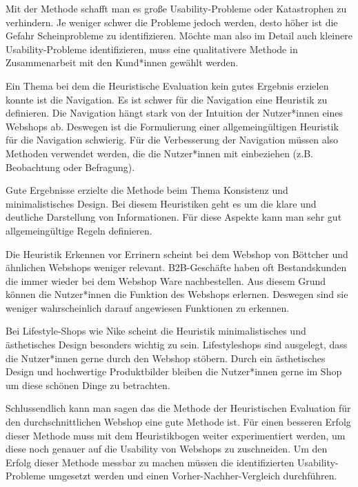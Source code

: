 \documentclass[utf8,biblatex]{lni}
\begin{document}
Mit der Methode schafft man es große Usability-Probleme oder Katastrophen zu verhindern. Je weniger schwer die Probleme jedoch werden, desto höher ist die Gefahr Scheinprobleme zu identifizieren. Möchte man also im Detail auch kleinere Usability-Probleme identifizieren, muss eine qualitativere Methode in Zusammenarbeit mit den Kund*innen gewählt werden.

Ein Thema bei dem die Heuristische Evaluation kein gutes Ergebnis erzielen konnte ist die Navigation. Es ist schwer für die Navigation eine Heuristik zu definieren. Die Navigation hängt stark von der Intuition der Nutzer*innen eines Webshops ab. Deswegen ist die Formulierung einer allgemeingültigen Heuristik für die Navigation schwierig. Für die Verbesserung der Navigation müssen also Methoden verwendet werden, die die Nutzer*innen mit einbeziehen (z.B. Beobachtung oder Befragung). 

Gute Ergebnisse erzielte die Methode beim Thema Konsistenz und minimalistisches Design. Bei diesem Heuristiken geht es um die klare und deutliche Darstellung von Informationen. Für diese Aspekte kann man sehr gut allgemeingültige Regeln definieren. 

Die Heuristik \glqq Erkennen vor Errinern\grqq{} scheint bei dem Webshop von Böttcher und ähnlichen Webshops weniger relevant. B2B-Geschäfte haben oft Bestandskunden die immer wieder bei dem Webshop Ware nachbestellen. Aus diesem Grund können die Nutzer*innen die Funktion des Webshops erlernen. Deswegen sind sie weniger wahrscheinlich darauf angewiesen Funktionen zu erkennen.

Bei Lifestyle-Shops wie Nike scheint die Heuristik \glqq minimalistisches und ästhetisches Design\grqq{} besonders wichtig zu sein. Lifestyleshops sind ausgelegt, dass die Nutzer*innen gerne durch den Webshop stöbern. Durch ein ästhetisches Design und hochwertige Produktbilder bleiben die Nutzer*innen gerne im Shop um diese schönen Dinge zu betrachten.

Schlussendlich kann man sagen das die Methode der Heuristischen Evaluation für den durchschnittlichen Webshop eine gute Methode ist. Für einen besseren Erfolg dieser Methode muss mit dem Heuristikbogen weiter experimentiert werden, um diese noch genauer auf die Usability von Webshops zu zuschneiden. Um den Erfolg dieser Methode messbar zu machen müssen die identifizierten Usability-Probleme umgesetzt werden und einen Vorher-Nachher-Vergleich durchführen.

\clearpage
\end{document}

